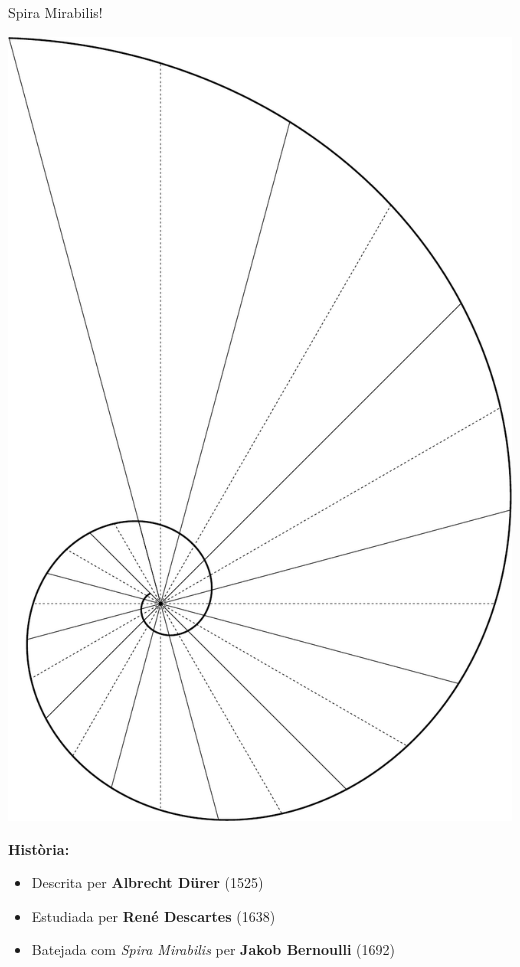 \documentclass[14pt]{beamer}
\begin{document}
    \begin{frame}{Spira Mirabilis!}
        \begin{center}
            \begin{minipage}{20ex}
                \includegraphics[height=32ex]{pictures/Spiral_Phi_90.pdf}
            \end{minipage} \begin{minipage}{29ex}
                \textbf{\large \quad Història:}
                \bigskip
                \begin{itemize}
                    \small
                    \item Descrita per \textbf{Albrecht Dürer} (1525)\\[2ex]
                    \item Estudiada per \textbf{René Descartes} (1638) \\[2ex]
                    \item Batejada com \emph{Spira Mirabilis} per \textbf{Jakob Bernoulli} (1692)
                \end{itemize}
            \end{minipage}            
        \end{center}
    \end{frame}

\end{document}
